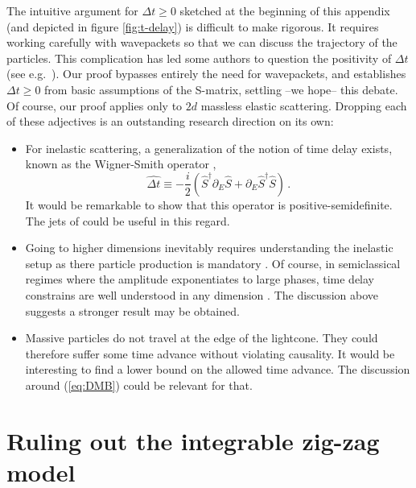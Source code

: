 \documentclass[
 reprint,
 amsmath,
 pre,
 amssymb,
 nofootinbib,
 aps,
 longbibliography,
]{revtex4-1}
\newcommand{\<}{{\langle}}
\renewcommand{\>}{{\rangle}}
\begin{document}
The intuitive argument for $\Delta t\geq 0$ sketched at the beginning of this appendix (and depicted in figure \ref{fig:t-delay}) is difficult to make rigorous. It requires working carefully with wavepackets so that we can discuss the trajectory of the particles. This complication has led some authors to question the positivity of $\Delta t$ (see e.g.\ \cite{Chen:2023rar}). Our proof bypasses entirely the need for wavepackets, and establishes $\Delta t\geq 0$ from basic assumptions of the S-matrix, settling --we hope-- this debate. Of course, our proof applies only to $2d$ massless elastic scattering. Dropping each of these adjectives is an outstanding research direction on its own:
\begin{itemize}

\item For inelastic scattering, a generalization of the notion of time delay exists, known as the Wigner-Smith operator \cite{Smith:1960zza,Martin:1976iw},
    \begin{equation}
        \widehat{\Delta t} \equiv -\frac{i}{2}\left(\hat S^\dagger \partial_{E} \hat S + \partial_{E} \hat S^\dagger \hat S\right)\,.
    \end{equation}
It would be remarkable to show that this operator is positive-semidefinite. The jets of \cite{Guerrieri:2024ckc} could be useful in this regard.

\item Going to higher dimensions inevitably requires understanding the inelastic setup as there particle production is mandatory \cite{Aks:1965qga}. Of course, in semiclassical regimes where the amplitude exponentiates to large phases, time delay constrains are well understood in any dimension \cite{Camanho:2014apa,Arkani-Hamed:2020blm}. The discussion above suggests a stronger result may be obtained.

\item  Massive particles do not travel at the edge of the lightcone. They could therefore suffer some time advance without violating causality. It would be interesting to find a lower bound on the allowed time advance. The discussion around (\ref{eq:DMB}) could be relevant for that.
\end{itemize}

\vspace{-0.6cm}
\section{Ruling out the integrable zig-zag model}
\label{app:zigzag}
\end{document}
